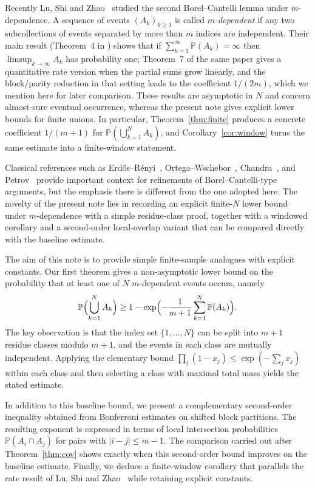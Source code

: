 \documentclass[11pt]{article}
\begin{document}
Recently Lu, Shi and Zhao~\cite{LuShiZhao2026} studied the second
Borel--Cantelli lemma under $m$-dependence.  A sequence of events
\((A_k)_{k\geq 1}\) is called \emph{$m$-dependent} if any two
subcollections of events separated by more than $m$ indices are
independent.  Their main result (Theorem~4 in
\cite{LuShiZhao2026}) shows that if \(\sum_{k=1}^\infty
\mathbb{P}(A_k)=\infty\) then \(\limsup_{k\to\infty} A_k\) has
probability one; Theorem~7 of the same paper gives a quantitative rate
version when the partial sums grow linearly, and the block/parity
reduction in that setting leads to the coefficient \(1/(2m)\), which
we mention here for later comparison.  These results are
asymptotic in $N$ and concern almost-sure eventual occurrence, whereas
the present note gives explicit lower bounds for finite unions.  In
particular, Theorem~\ref{thm:finite} produces a concrete coefficient
\(1/(m+1)\) for
\(\mathbb{P}(\bigcup_{k=1}^N A_k)\), and Corollary~\ref{cor:window}
turns the same estimate into a finite-window statement.

Classical references such as Erd\H{o}s--R\'enyi~\cite{ErdosRenyi1959},
Ortega--Wschebor~\cite{OrtegaWschebor1984}, Chandra~\cite{Chandra1999},
and Petrov~\cite{Petrov2002} provide important context for refinements
of Borel--Cantelli-type arguments, but the emphasis there is different
from the one adopted here.  The novelty of the present note lies in
recording an explicit finite-$N$ lower bound under $m$-dependence with
a simple residue-class proof, together with a windowed corollary and a
second-order local-overlap variant that can be compared directly with
the baseline estimate.

The aim of this note is to provide simple finite-sample analogues with
explicit constants.  Our first theorem gives a non-asymptotic lower
bound on the probability that at least one of $N$ $m$-dependent
events occurs, namely
\[
  \mathbb{P}\Bigl(\bigcup_{k=1}^N A_k\Bigr)
  \ge 1-\exp\Bigl(-\frac{1}{m+1}\sum_{k=1}^N \mathbb{P}(A_k)\Bigr).
\]
The key observation is that the index set \(\{1,\dots,N\}\) can be
split into \(m+1\) residue classes modulo \(m+1\), and the events in
each class are mutually independent.  Applying the elementary bound
\(\prod_j(1-x_j)\le \exp(-\sum_j x_j)\) within each class and then
selecting a class with maximal total mass yields the stated estimate.

In addition to this baseline bound, we present a complementary
second-order inequality obtained from Bonferroni estimates on shifted
block partitions.  The resulting exponent is expressed in terms of
local intersection probabilities \(\mathbb{P}(A_i\cap A_j)\) for
pairs with \(|i-j|\le m-1\).  The comparison carried out after
Theorem~\ref{thm:cov} shows exactly when this second-order bound
improves on the baseline estimate.  Finally, we deduce a finite-window
corollary that
parallels the rate result of Lu, Shi and Zhao~\cite{LuShiZhao2026}
while retaining explicit constants.
\end{document}
